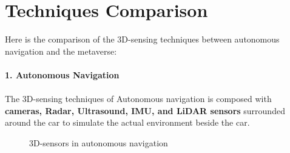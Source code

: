 \section{Techniques Comparison}
\label{section:techniques}
Here is the comparison of the 3D-sensing techniques between autonomous navigation and the metaverse:
\\\\
\textbf{1.	Autonomous Navigation}
\\\\
The 3D-sensing techniques of Autonomous navigation is composed with \textbf{cameras, Radar, Ultrasound, IMU, and LiDAR sensors} surrounded around the car to simulate the actual environment beside the car.
\begin{figure}[H]
    \centering
    \caption[Short text]{3D-sensors in autonomous navigation \cite{autonomousPic}}
    \label{fig:Camera}
\end{figure}

